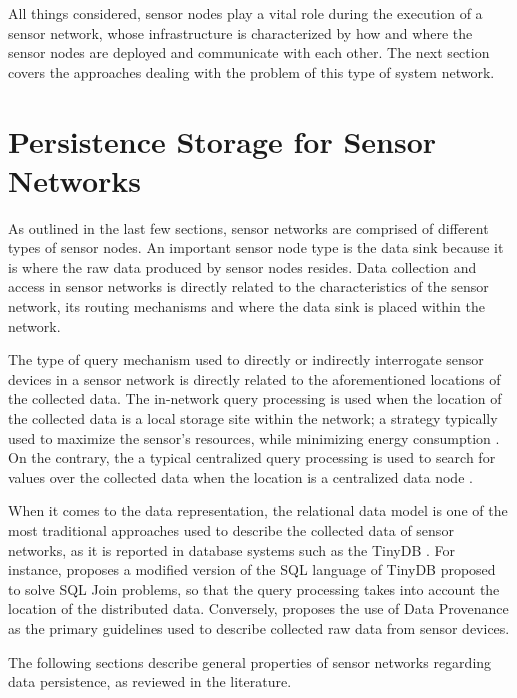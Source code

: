 All things considered, sensor nodes play a vital role during the execution
of a sensor network, whose infrastructure is characterized by how and where the
sensor nodes are deployed and communicate with each other. The next
section covers the approaches dealing with the problem of this type of system
network.

\section{Persistence Storage for Sensor Networks}
\label{sec:sn-persitence-storage}

As outlined in the last few sections, sensor networks are comprised of
different types of sensor nodes. An important sensor node type is the
data sink because it is where the raw data produced by sensor
nodes resides. Data collection and access in sensor networks is directly
related to the characteristics of the sensor network, its routing mechanisms
and where the data sink is placed within the network.

The type of query mechanism used to directly or indirectly interrogate sensor
devices in a sensor network is directly related to the aforementioned locations
of the collected data. The in-network query processing is used when the
location of the collected data is a local storage site \cite{sn-storage01,
sn-data-centric-storage} within the network; a strategy typically used to maximize the
sensor's resources, while minimizing energy consumption \cite{sn-storage04}. On
the contrary, the a typical centralized query processing is used to search for
values over the collected data when the location is a centralized data
node \cite{sn-storage02}.

When it comes to the data representation, the relational data model
\cite{relational-model} is one of the most traditional approaches used to
describe the collected data of sensor networks, as it is reported in database
systems such as the TinyDB \cite{sn-db-tinydb}. For instance, \cite{sn-db-newop}
proposes a modified version of the SQL language of TinyDB proposed to solve
SQL Join problems, so that the query processing takes into account the location
of the distributed data. Conversely, \cite{sn-provenance} proposes the use of
Data Provenance as the primary guidelines used to describe collected  raw data from
sensor devices.

The following sections describe general properties of sensor networks regarding
data persistence, as reviewed in the literature.

